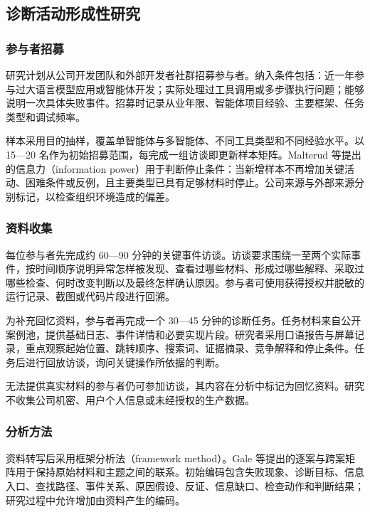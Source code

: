 \subsection{诊断活动形成性研究}

\subsubsection{参与者招募}

研究计划从公司开发团队和外部开发者社群招募参与者。纳入条件包括：近一年参与过大语言模型应用或智能体开发；实际处理过工具调用或多步骤执行问题；能够说明一次具体失败事件。招募时记录从业年限、智能体项目经验、主要框架、任务类型和调试频率。

样本采用目的抽样，覆盖单智能体与多智能体、不同工具类型和不同经验水平。以 15—20 名作为初始招募范围，每完成一组访谈即更新样本矩阵。Malterud 等\cite{malterud2016information}提出的信息力（information power）用于判断停止条件：当新增样本不再增加关键活动、困难条件或反例，且主要类型已具有足够材料时停止。公司来源与外部来源分别标记，以检查组织环境造成的偏差。

\subsubsection{资料收集}

每位参与者先完成约 60—90 分钟的关键事件访谈。访谈要求围绕一至两个实际事件，按时间顺序说明异常怎样被发现、查看过哪些材料、形成过哪些解释、采取过哪些检查、何时改变判断以及最终怎样确认原因。参与者可使用获得授权并脱敏的运行记录、截图或代码片段进行回溯。

为补充回忆资料，参与者再完成一个 30—45 分钟的诊断任务。任务材料来自公开案例池，提供基础日志、事件详情和必要实现片段。研究者采用口语报告与屏幕记录，重点观察起始位置、跳转顺序、搜索词、证据摘录、竞争解释和停止条件。任务后进行回放访谈，询问关键操作所依据的判断。

无法提供真实材料的参与者仍可参加访谈，其内容在分析中标记为回忆资料。研究不收集公司机密、用户个人信息或未经授权的生产数据。

\subsubsection{分析方法}

资料转写后采用框架分析法（framework method）。Gale 等\cite{gale2013framework}提出的逐案与跨案矩阵用于保持原始材料和主题之间的联系。初始编码包含失败现象、诊断目标、信息入口、查找路径、事件关系、原因假设、反证、信息缺口、检查动作和判断结果；研究过程中允许增加由资料产生的编码。

